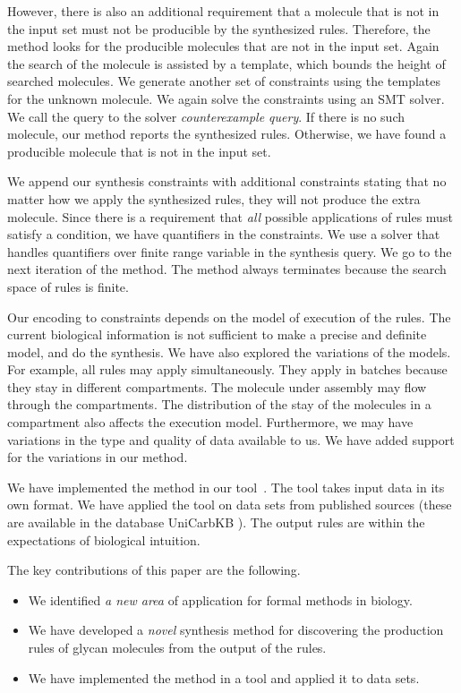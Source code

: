 However, there is also an additional requirement that a molecule
that is not in the input set must not be producible by the synthesized rules.
Therefore, the method looks for the producible molecules that are not in the input set.
Again the search of the molecule is assisted by a template, which bounds the height
of searched molecules.
We generate another set of constraints using the templates for the unknown molecule.
We again solve the constraints using an SMT solver.
We call the query to the solver {\em counterexample query}.
If there is no such molecule, our method reports
the synthesized rules.
Otherwise, we have found a producible molecule that is not in the input set.

We append our synthesis constraints with additional constraints stating that
no matter how we apply the synthesized rules, they will not produce the extra molecule.
Since there is a requirement that {\em all} possible applications of rules must satisfy
a condition, we have quantifiers in the constraints.
We use a solver that handles quantifiers over finite range variable in
the synthesis query.
We go to the next iteration of the method.
The method always terminates because the search space of rules is finite.

Our encoding to constraints depends on the model of execution of the rules.
The current biological information is not sufficient to make a precise
and definite model, and do the synthesis.
We have also explored the variations of the models. For example, all rules
may apply simultaneously. They apply in batches because they
stay in different compartments.
The molecule under assembly may flow through the compartments.
The distribution of the stay of the molecules in a compartment also affects
the execution model.
Furthermore, we may have variations in the type and quality of data available to us.
We have added support for the variations in our method.

We have implemented the method in our tool~\ourtool. The tool takes input data in its own format.
We have applied the tool on data sets from published sources (these are available in the database UniCarbKB \cite{Campbell2013}).
The output rules are within the expectations of biological
intuition.

The key contributions of this paper are the following.
\begin{itemize}
\item We identified {\em a new area} of application for formal methods in biology.
\item We have developed a {\em novel} synthesis method for discovering the production rules of glycan molecules from the output of the rules.
\item We have implemented the method in a tool and applied it to data sets.
\end{itemize}


